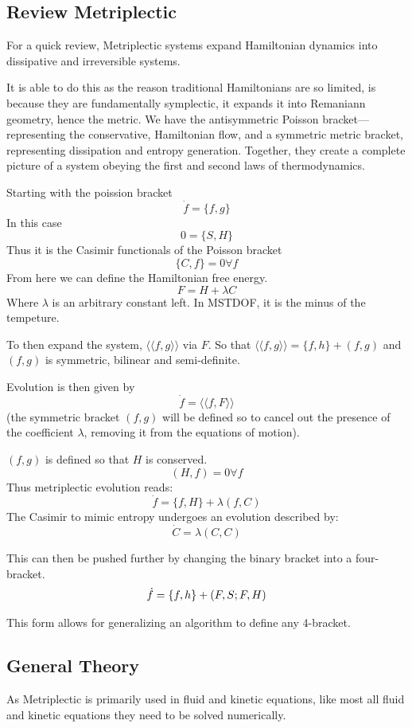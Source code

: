 \subsection{Review Metriplectic}
For a quick review, Metriplectic systems expand Hamiltonian dynamics into dissipative and irreversible systems.

It is able to do this as the reason traditional Hamiltonians are so limited, is because they are fundamentally symplectic, it expands it into Remaniann geometry, hence the metric. We have the antisymmetric Poisson bracket—representing the conservative, Hamiltonian flow, and a symmetric metric bracket, representing dissipation and entropy generation. Together, they create a complete picture of a system obeying the first and second laws of thermodynamics.

Starting with the poission bracket
$$\dot{f}=\{f,g\}$$
In this case
$$0= \{S,H\}$$
Thus it is the Casimir functionals of the Poisson bracket
$$\{C,f\}=0 \forall f$$
From here we can define the Hamiltonian free energy.
$$F=H+\lambda C $$
Where $\lambda$ is an arbitrary constant left. In MSTDOF, it is the minus of the tempeture.

To then expand the system, $\langle\langle f,g \rangle \rangle$ via $F$. So that $\langle\langle f, g\rangle \rangle=\{f,h\} + (f,g)$ and $(f,g)$ is symmetric, bilinear and semi-definite.

Evolution is then given by
$$\dot{f}=\langle\langle f, F\rangle \rangle$$
(the symmetric bracket $(f,g)$ will be defined so to cancel out the presence of the coefficient
 $\lambda$, removing it from the equations of motion).

 $(f,g)$ is defined so that $H$ is conserved.
 $$(H, f) = 0 \forall f$$
 Thus metriplectic evolution reads:
 $$\dot{f}=\{f,H\}+\lambda(f,C)$$
 The Casimir to mimic entropy undergoes an evolution described by:
 $$\dot{C}=\lambda(C,C)$$


This can then be pushed further by changing the binary bracket into a four-bracket.
\[
\dot{f} = \pb{f}{h} + (F,S;F,H)
  \]

  This form allows for generalizing an algorithm to define any 4-bracket.


\subsection{General Theory}

As Metriplectic is primarily used in fluid and kinetic equations, like most all fluid and kinetic equations they need to be solved numerically.

